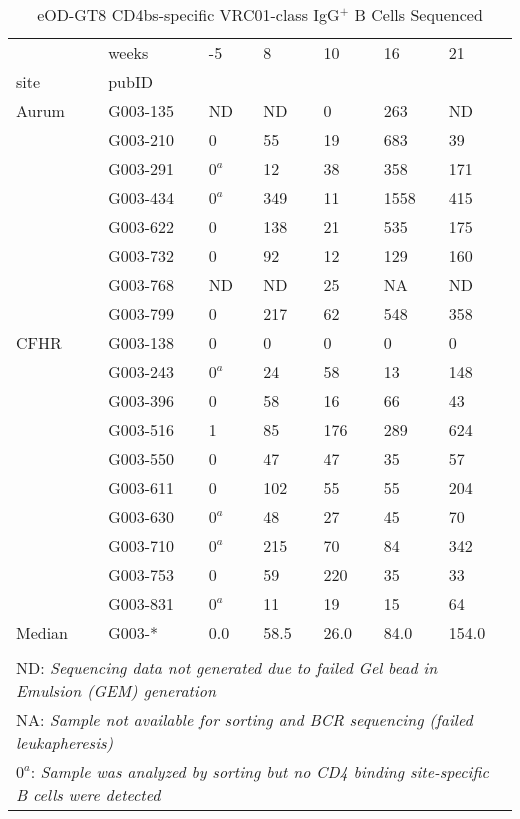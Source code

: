 \documentclass{article}
\begin{document}
    \begin{table}
\centering
\caption{eOD-GT8 CD4bs-specific VRC01-class IgG$^{+}$ B Cells Sequenced}
\begin{tabular}{lllllll}
\toprule
       & weeks &     -5 &     8 &    10 &    16 &     21 \\
site & pubID &        &       &       &       &        \\
\midrule
Aurum & G003-135 &  ND &  ND &  0 &  263 &  ND \\
       & G003-210 &  0 &  55 &  19 &  683 &  39 \\
       & G003-291 &  $0^a$ &  12 &  38 &  358 &  171 \\
       & G003-434 &  $0^a$ &  349 &  11 &  1558 &  415 \\
       & G003-622 &  0 &  138 &  21 &  535 &  175 \\
       & G003-732 &  0 &  92 &  12 &  129 &  160 \\
       & G003-768 &  ND &  ND &  25 &  NA &  ND \\
       & G003-799 &  0 &  217 &  62 &  548 &  358 \\
\midrule
CFHR & G003-138 &  0 &  0 &  0 &  0 &  0 \\
       & G003-243 &  $0^a$ &  24 &  58 &  13 &  148 \\
       & G003-396 &  0 &  58 &  16 &  66 &  43 \\
       & G003-516 &  1 &  85 &  176 &  289 &  624 \\
       & G003-550 &  0 &  47 &  47 &  35 &  57 \\
       & G003-611 &  0 &  102 &  55 &  55 &  204 \\
       & G003-630 &  $0^a$ &  48 &  27 &  45 &  70 \\
       & G003-710 &  $0^a$ &  215 &  70 &  84 &  342 \\
       & G003-753 &  0 &  59 &  220 &  35 &  33 \\
       & G003-831 &  $0^a$ &  11 &  19 &  15 &  64 \\
\midrule
Median & G003-* &  0.0 &  58.5 &  26.0 &  84.0 &  154.0 \\
\bottomrule
\multicolumn{7}{l}{\tiny } \\
\multicolumn{7}{l}{\tiny ND: \textit{Sequencing data not generated due to failed Gel bead in Emulsion (GEM) generation}} \\
\multicolumn{7}{l}{\tiny NA: \textit{Sample not available for sorting and BCR sequencing (failed leukapheresis)}} \\
\multicolumn{7}{l}{\tiny $0^a$: \textit{Sample was analyzed by sorting but no CD4 binding site-specific B cells were detected}} \\
\end{tabular}
\end{table}
\end{document}

